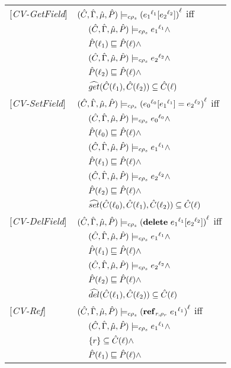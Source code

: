 \begin{tabular} {l l l l}
{[\textit{CV-GetField}]}&\multicolumn{3}{l}{$(\hat{C},\hat{\Gamma},\hat{\mu},\hat{P}) \models_{c \rho_s} {({e_1}^{\ell_1}[{e_2}^{\ell_2}])}^{\ell} $ iff}\\
&&\multicolumn{2}{l}{$ (\hat{C},\hat{\Gamma},\hat{\mu},\hat{P}) \models_{c \rho_s} {e_1}^{\ell_1} \wedge $}\\
&&\multicolumn{2}{l}{$\hat{P}(\ell_1) \sqsubseteq \hat{P}(\ell) \wedge$} \\
&&\multicolumn{2}{l}{$ (\hat{C},\hat{\Gamma},\hat{\mu},\hat{P}) \models_{c \rho_s} {e_2}^{\ell_2} \wedge $} \\
&&\multicolumn{2}{l}{$\hat{P}(\ell_2) \sqsubseteq \hat{P}(\ell) \wedge$} \\
&&\multicolumn{2}{l}{$\widehat{get} (\hat{C}(\ell_1), \hat{C}(\ell_2)) \subseteq \hat{C}(\ell)$} \\
{[\textit{CV-SetField}]}&\multicolumn{3}{l}{$(\hat{C},\hat{\Gamma},\hat{\mu},\hat{P}) \models_{c \rho_s} {({e_0}^{\ell_0}[{e_1}^{\ell_1}] = {e_2}^{\ell_2})}^{\ell} $ iff}\\
&&\multicolumn{2}{l}{$ (\hat{C},\hat{\Gamma},\hat{\mu},\hat{P}) \models_{c \rho_s} {e_0}^{\ell_0} \wedge $}\\
&&\multicolumn{2}{l}{$\hat{P}(\ell_0) \sqsubseteq \hat{P}(\ell) \wedge$} \\
&&\multicolumn{2}{l}{$ (\hat{C},\hat{\Gamma},\hat{\mu},\hat{P}) \models_{c \rho_s} {e_1}^{\ell_1} \wedge $} \\
&&\multicolumn{2}{l}{$\hat{P}(\ell_1) \sqsubseteq \hat{P}(\ell) \wedge$} \\
&&\multicolumn{2}{l}{$ (\hat{C},\hat{\Gamma},\hat{\mu},\hat{P}) \models_{c \rho_s} {e_2}^{\ell_2} \wedge $} \\
&&\multicolumn{2}{l}{$\hat{P}(\ell_2) \sqsubseteq \hat{P}(\ell) \wedge$} \\
&&\multicolumn{2}{l}{$\widehat{set} (\hat{C}(\ell_0), \hat{C}(\ell_1), \hat{C}(\ell_2)) \subseteq \hat{C}(\ell)$} \\
{[\textit{CV-DelField}]}&\multicolumn{3}{l}{$(\hat{C},\hat{\Gamma},\hat{\mu},\hat{P}) \models_{c \rho_s} {(\mathbf{delete}\ {e_1}^{\ell_1}[{e_2}^{\ell_2}])}^{\ell} $ iff}\\ 
&&\multicolumn{2}{l}{$ (\hat{C},\hat{\Gamma},\hat{\mu},\hat{P}) \models_{c \rho_s} {e_1}^{\ell_1} \wedge $}\\
&&\multicolumn{2}{l}{$\hat{P}(\ell_1) \sqsubseteq \hat{P}(\ell) \wedge$} \\
&&\multicolumn{2}{l}{$ (\hat{C},\hat{\Gamma},\hat{\mu},\hat{P}) \models_{c \rho_s} {e_2}^{\ell_2} \wedge $} \\
&&\multicolumn{2}{l}{$\hat{P}(\ell_2) \sqsubseteq \hat{P}(\ell) \wedge$} \\
&&\multicolumn{2}{l}{$\widehat{del} (\hat{C}(\ell_1), \hat{C}(\ell_2)) \subseteq \hat{C}(\ell)$}\\
{[\textit{CV-Ref}]}&\multicolumn{3}{l}{$ (\hat{C},\hat{\Gamma},\hat{\mu},\hat{P}) \models_{c \rho_s} {(\mathbf{ref}_{r,\rho_r}\ {e_1}^{\ell_1})}^{\ell} $ iff}\\
&&\multicolumn{2}{l}{$(\hat{C},\hat{\Gamma},\hat{\mu},\hat{P}) \models_{c \rho_s} {e_1}^{\ell_1} \wedge $}\\
&&\multicolumn{2}{l}{$\{r\} \subseteq \hat{C}(\ell) \wedge$}\\
&&\multicolumn{2}{l}{$\hat{P}(\ell_1) \sqsubseteq \hat{P}(\ell) \wedge$}\\

\end{tabular}

